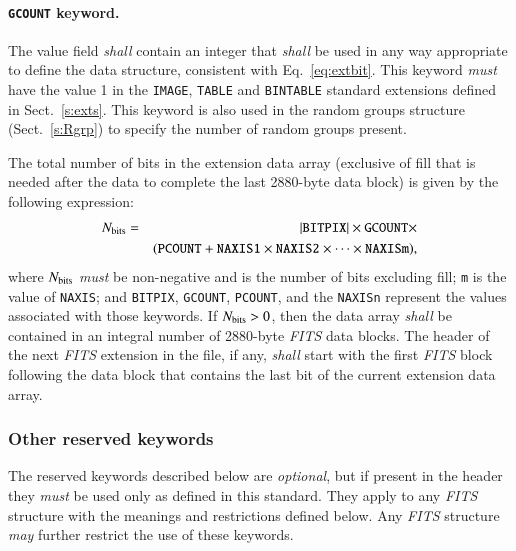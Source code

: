 \documentclass[onecolumn]{aa}
\begin{document}
   \paragraph{{\tt GCOUNT} keyword.}
 The value field {\em shall} contain an integer that {\em shall} be
 used in any way appropriate to define the data structure,
 consistent with Eq.~\ref{eq:extbit}. 
 This keyword {\em must} have the value 1
 in the {\tt IMAGE}, {\tt TABLE} and {\tt BINTABLE} standard extensions 
 defined in Sect.\ \ref{s:exts}.
 This keyword is also used in the random groups structure (Sect.\ \ref{s:Rgrp})
 to specify the number of random groups present.
 
 The total number of bits in the extension data array 
 (exclusive of fill that is needed after the data to complete the last 2880-byte data block) 
 is given by the following expression:
\begin{eqnarray}  
   \mbox{$N_{\rm bits}$} &=&  
                     |\mbox{{\tt BITPIX}}| \times \label{eq:extbit}
                      \mbox{{\tt GCOUNT}} \times \nonumber \\
                & &  (\mbox{{\tt PCOUNT}} + \mbox{{\tt NAXIS1}} \times 
                 \mbox{{\tt NAXIS2}} \times  \cdots \times \mbox{{\tt
NAXISm}}),
\end{eqnarray}
 \noindent
 where $N_{\rm bits}$ {\em must} be
 non-negative and is the number of bits excluding fill; 
 {\tt m} is the value of {\tt NAXIS}; and
 {\tt BITPIX}, {\tt GCOUNT}, 
 {\tt PCOUNT}, and the {\tt NAXISn}
represent
 the values associated with those keywords.
If $N_{\rm bits} > 0$, then the
data array {\em shall} be contained in an integral number of
2880-byte {\em FITS} data blocks.  The header of the next {\em FITS\/} extension 
in the file, if any, {\em shall} start with the first {\em FITS\/} block following 
the data block that contains the last bit of the current extension data array.
     


\subsubsection{Other reserved keywords}
 \label{s:resk}
   The reserved keywords described
   below are {\em optional}, but if present in the header they {\em must} be 
   used only as defined in this standard.
   They apply to any {\em FITS\/} 
   structure 
   with the meanings and restrictions defined below.  
   Any {\em FITS\/} structure {\em may} further restrict the use of 
   these keywords.
   
\end{document}

